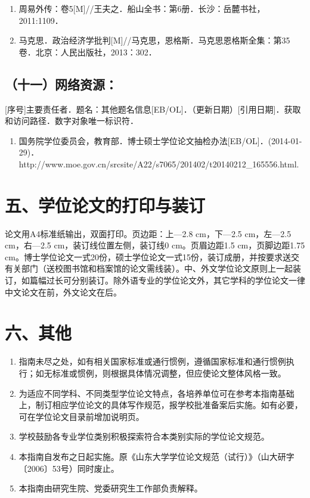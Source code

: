 \begin{enumerate}
\item[1] 周易外传：卷5[M]//王夫之．船山全书：第6册．长沙：岳麓书社，2011:1109．
\item[2] 马克思．政治经济学批判[M]//马克思，恩格斯．马克思恩格斯全集：第35卷．北京：人民出版社，2013：302．
\end{enumerate}

\subsection{（十一）网络资源：}
[序号]主要责任者．题名：其他题名信息[EB/OL]．（更新日期）[引用日期]．获取和访问路径．数字对象唯一标识符．

\begin{enumerate}
\item[1] 国务院学位委员会，教育部．博士硕士学位论文抽检办法[EB/OL]．(2014-01-29)．http://www.moe.gov.cn/srcsite/A22/s7065/201402/t20140212\_165556.html.
\end{enumerate}

\section{五、学位论文的打印与装订}
论文用A4标准纸输出，双面打印。页边距：上—2.8 cm，下—2.5 cm，左—2.5 cm，右—2.5 cm，装订线位置左侧，装订线0 cm。页眉边距1.5 cm，页脚边距1.75 cm。博士学位论文一式20份，硕士学位论文一式15份，装订成册，并按要求送交有关部门（送校图书馆和档案馆的论文需线装）。中、外文学位论文原则上一起装订，如篇幅过长可分别装订。除外语专业的学位论文外，其它学科的学位论文一律中文论文在前，外文论文在后。

\section{六、其他}
\begin{enumerate}
\item[(一)] 指南未尽之处，如有相关国家标准或通行惯例，遵循国家标准和通行惯例执行；如无标准或惯例，则根据具体情况调整，但应使论文整体风格一致。
\item[(二)] 为适应不同学科、不同类型学位论文特点，各培养单位可在参考本指南基础上，制订相应学位论文的具体写作规范，报学校批准备案后实施。如有必要，可在学位论文目录前增加说明页。
\item[(三)] 学校鼓励各专业学位类别积极探索符合本类别实际的学位论文规范。
\item[(四)] 本指南自发布之日起实施。原《山东大学学位论文规范（试行）》（山大研字〔2006〕53号）同时废止。
\item[(五)] 本指南由研究生院、党委研究生工作部负责解释。
\end{enumerate}